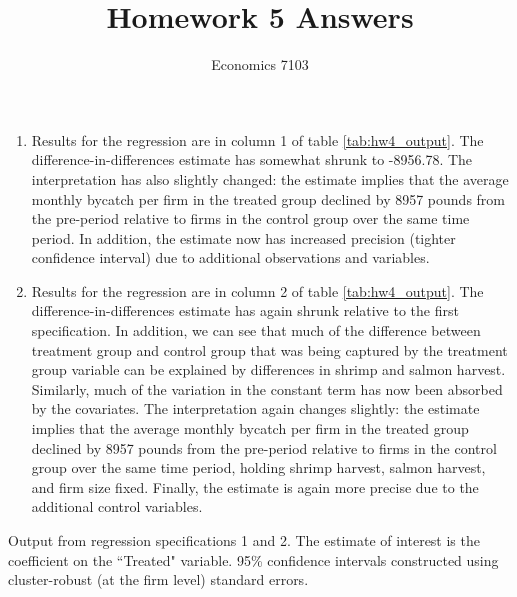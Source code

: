 \documentclass{article}
\title{Homework 5 Answers}
\author{Economics 7103}
\begin{document}
  
\maketitle

\begin{enumerate}
\item Results for the regression are in column 1 of table \ref{tab:hw4_output}.  The difference-in-differences estimate has somewhat shrunk to -8956.78.  The interpretation has also slightly changed: the estimate implies that the average monthly bycatch per firm in the treated group declined by 8957 pounds from the pre-period relative to firms in the control group over the same time period.  In addition, the estimate now has increased precision (tighter confidence interval) due to additional observations and variables.  
\item Results for the regression are in column 2 of table \ref{tab:hw4_output}.  The difference-in-differences estimate has again shrunk relative to the first specification.  In addition, we can see that much of the difference between treatment group and control group that was being captured by the treatment group variable can be explained by differences in shrimp and salmon harvest.  Similarly, much of the variation in the constant term has now been absorbed by the covariates.  The interpretation again changes slightly: the estimate implies that the average monthly bycatch per firm in the treated group declined by 8957 pounds from the pre-period relative to firms in the control group over the same time period, holding shrimp harvest, salmon harvest, and firm size fixed.  Finally, the estimate is again more precise due to the additional control variables.
\end{enumerate}

\begin{table}[h]
    \centering
    
    \caption{Output from regression specifications 1 and 2.  The estimate of interest is the coefficient on the ``Treated" variable. 95\% confidence intervals constructed using cluster-robust (at the firm level) standard errors. }
    \label{tab:hw4_output}
\end{table}{}
\end{document}
